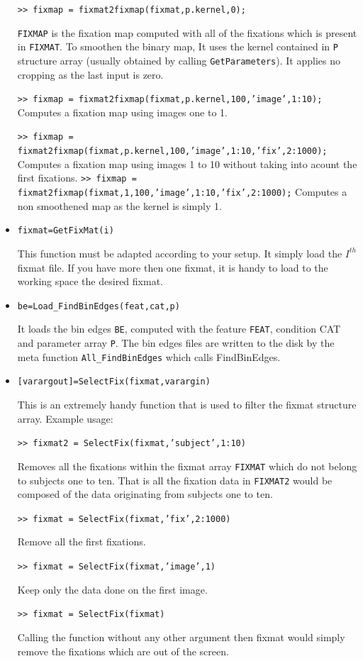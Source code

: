 \documentclass[a4paper,10pt]{report}
\begin{document}
\begin{itemize}
	\texttt{>> fixmap = fixmat2fixmap(fixmat,p.kernel,0);}

	\texttt{FIXMAP} is the fixation map computed with all of the fixations which is present in \texttt{FIXMAT}. To smoothen the binary map, It uses the kernel contained in \texttt{P} structure array (usually obtained by calling \texttt{GetParameters}). It applies no cropping as the last input is zero.

	\texttt{>> fixmap = fixmat2fixmap(fixmat,p.kernel,100,'image',1:10);}
	Computes a fixation map using images one to 1.

	\texttt{>> fixmap = fixmat2fixmap(fixmat,p.kernel,100,'image',1:10,'fix',2:1000);}
	Computes a fixation map using images 1 to 10 without taking into acount the first fixations.
	\texttt{>> fixmap = fixmat2fixmap(fixmat,1,100,'image',1:10,'fix',2:1000);}
	Computes a non smoothened map as the kernel is simply 1.

\item \texttt{fixmat=GetFixMat(i)}

This function must be adapted according to your setup. It simply load the \texttt{$I^{th}$} fixmat file. If you have more then one fixmat, it is handy to load to the working space the desired fixmat.

\item \texttt{be=Load\_FindBinEdges(feat,cat,p)}

It loads the bin edges \texttt{BE}, computed with the feature \texttt{FEAT}, condition CAT and parameter array \texttt{P}. The bin edges files are written to the disk by the meta function \texttt{All\_FindBinEdges} which calls FindBinEdges.

\item \texttt{[varargout]=SelectFix(fixmat,varargin)}

This is an extremely handy function that is used to filter the fixmat structure array. Example usage:


\texttt{>> fixmat2 = SelectFix(fixmat,'subject',1:10)}

	Removes all the fixations within the fixmat array \texttt{FIXMAT} which do not belong to subjects one to ten. That is all the fixation data in \texttt{FIXMAT2} would be composed of the data originating from subjects one to ten.

\texttt{>> fixmat = SelectFix(fixmat,'fix',2:1000)}

	Remove all the first fixations.

\texttt{>> fixmat = SelectFix(fixmat,'image',1)}

	Keep only the data done on the first image.

\texttt{>> fixmat = SelectFix(fixmat)}

	Calling the function without any other argument then fixmat would simply remove the fixations which are out of the screen.

\end{itemize}
\end{document}
